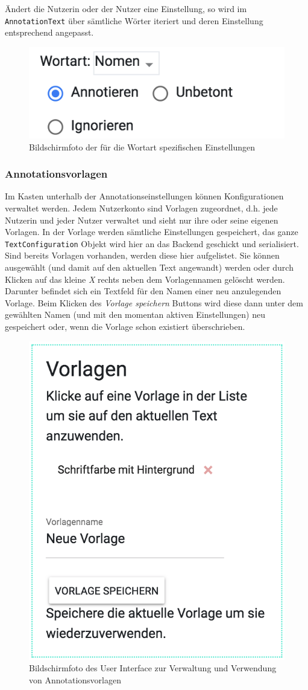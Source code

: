 Ändert die Nutzerin oder der Nutzer eine Einstellung, so wird im \texttt{AnnotationText} über sämtliche Wörter iteriert und deren Einstellung entsprechend angepasst.

\begin{figure}[h!]
	\centering
	\includegraphics[width=.4\linewidth, frame]{figures/frontend/config-pos}
	\caption{Bildschirmfoto der für die Wortart spezifischen Einstellungen}
	\label{fig:frontend-pos-einstellungen}
\end{figure}

\subsubsection{Annotationsvorlagen}

Im Kasten unterhalb der Annotationseinstellungen können Konfigurationen verwaltet werden. Jedem Nutzerkonto sind Vorlagen zugeordnet, d.h. jede Nutzerin und jeder Nutzer verwaltet und sieht nur ihre oder seine eigenen Vorlagen. In der Vorlage werden sämtliche Einstellungen gespeichert, das ganze \texttt{TextConfiguration} Objekt wird hier an das Backend geschickt und serialisiert.\\

Sind bereits Vorlagen vorhanden, werden diese hier aufgelistet. Sie können ausgewählt (und damit auf den aktuellen Text angewandt) werden oder durch Klicken auf das kleine \textit{X} rechts neben dem Vorlagennamen gelöscht werden. Darunter befindet sich ein Textfeld für den Namen einer neu anzulegenden Vorlage. Beim Klicken des \textit{Vorlage speichern} Buttons wird diese dann unter dem gewählten Namen (und mit den momentan aktiven Einstellungen) neu gespeichert oder, wenn die Vorlage schon existiert überschrieben.

\begin{figure}[h!]
	\centering
	\includegraphics[width=.4\linewidth]{figures/frontend/config-vorlagen}
	\caption{Bildschirmfoto des User Interface zur Verwaltung und Verwendung von Annotationsvorlagen}
	\label{fig:frontend-vorlagen}
\end{figure}

